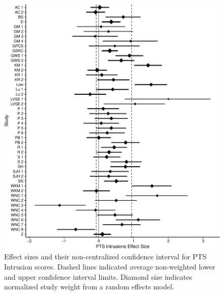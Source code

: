 \documentclass[english,man]{apa6}
\theoremstyle{definition}
\theoremstyle{definition}
\theoremstyle{definition}
\theoremstyle{remark}
\begin{document}
\begin{figure}
\centering
\includegraphics{meta_markdown_files/figure-latex/ptspicint-1.pdf}
\caption{\label{fig:ptspicint}Effect sizes and their non-centralized
confidence interval for PTS Intrusion scores. Dashed lines indicated
average non-weighted lower and upper confidence interval limits. Diamond
size indicates normalized study weight from a random effects model.}
\end{figure}
\end{document}
